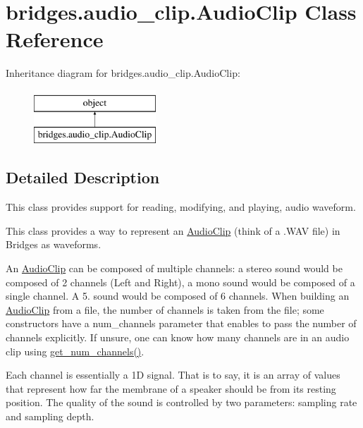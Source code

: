 \hypertarget{classbridges_1_1audio__clip_1_1_audio_clip}{}\section{bridges.\+audio\+\_\+clip.\+Audio\+Clip Class Reference}
\label{classbridges_1_1audio__clip_1_1_audio_clip}
Inheritance diagram for bridges.\+audio\+\_\+clip.\+Audio\+Clip\+:\begin{figure}[H]
\begin{center}
\leavevmode
\includegraphics[height=2.000000cm]{classbridges_1_1audio__clip_1_1_audio_clip}
\end{center}
\end{figure}


\subsection{Detailed Description}
This class provides support for reading, modifying, and playing, audio waveform. 

This class provides a way to represent an \hyperlink{classbridges_1_1audio__clip_1_1_audio_clip}{Audio\+Clip} (think of a .W\+AV file) in Bridges as waveforms.

An \hyperlink{classbridges_1_1audio__clip_1_1_audio_clip}{Audio\+Clip} can be composed of multiple channels\+: a stereo sound would be composed of 2 channels (Left and Right), a mono sound would be composed of a single channel. A 5. sound would be composed of 6 channels. When building an \hyperlink{classbridges_1_1audio__clip_1_1_audio_clip}{Audio\+Clip} from a file, the number of channels is taken from the file; some constructors have a num\+\_\+channels parameter that enables to pass the number of channels explicitly. If unsure, one can know how many channels are in an audio clip using \hyperlink{classbridges_1_1audio__clip_1_1_audio_clip_af881900e292374fabf1f53a253571e5f}{get\+\_\+num\+\_\+channels()}.

Each channel is essentially a 1D signal. That is to say, it is an array of values that represent how far the membrane of a speaker should be from its resting position. The quality of the sound is controlled by two parameters\+: sampling rate and sampling depth.

